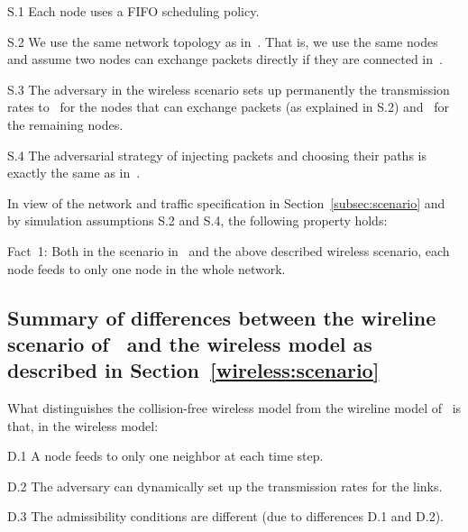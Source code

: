 \documentclass[journal,twocolumn]{./IEEEtran}
\begin{document}
\begin{description} 
\item{S.1}
Each node uses a FIFO scheduling policy.

\item{S.2}
We use the same network topology as in~\cite{DBLP:journals/ton/BennettBCCB02}. That is, we use the same nodes and assume two nodes can exchange packets directly if they are connected in~\cite{DBLP:journals/ton/BennettBCCB02}.


\item{S.3}
The adversary in the wireless scenario sets up permanently the transmission rates to~ for the nodes that  can exchange packets (as explained in S.2) and~ for the remaining nodes.

\item{S.4}
The adversarial strategy of injecting packets and choosing their paths is exactly the same as in~\cite{DBLP:journals/ton/BennettBCCB02}.

\end{description}



In view of the network and traffic specification in Section~\ref{subsec:scenario} and by simulation assumptions S.2 and S.4, the following property holds:
\begin{description}
\item{Fact~1:}
Both in the scenario in~\cite{DBLP:journals/ton/BennettBCCB02} and the above described wireless scenario, each node feeds to  only  one node in the whole network.
\end{description}



\subsection{Summary of differences between the wireline scenario of~\cite{DBLP:journals/ton/BennettBCCB02} and the wireless model as described in Section~\ref{wireless:scenario}}

What distinguishes the collision-free wireless model from the wireline model of~\cite{DBLP:journals/ton/BennettBCCB02} is that, in the wireless model:
\begin{description}
\item{D.1}
A node feeds to only one neighbor at each time step.
\item{D.2}
The adversary can dynamically set up the transmission rates for the links.
\item{D.3}
The admissibility conditions are different (due to differences D.1 and D.2).
\end{description}
\end{document}
